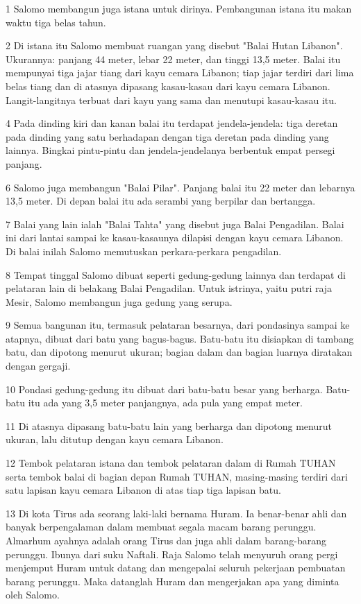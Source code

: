 \par 1 Salomo membangun juga istana untuk dirinya. Pembangunan istana itu makan waktu tiga belas tahun.
\par 2 Di istana itu Salomo membuat ruangan yang disebut "Balai Hutan Libanon". Ukurannya: panjang 44 meter, lebar 22 meter, dan tinggi 13,5 meter. Balai itu mempunyai tiga jajar tiang dari kayu cemara Libanon; tiap jajar terdiri dari lima belas tiang dan di atasnya dipasang kasau-kasau dari kayu cemara Libanon. Langit-langitnya terbuat dari kayu yang sama dan menutupi kasau-kasau itu.
\par 4 Pada dinding kiri dan kanan balai itu terdapat jendela-jendela: tiga deretan pada dinding yang satu berhadapan dengan tiga deretan pada dinding yang lainnya. Bingkai pintu-pintu dan jendela-jendelanya berbentuk empat persegi panjang.
\par 6 Salomo juga membangun "Balai Pilar". Panjang balai itu 22 meter dan lebarnya 13,5 meter. Di depan balai itu ada serambi yang berpilar dan bertangga.
\par 7 Balai yang lain ialah "Balai Tahta" yang disebut juga Balai Pengadilan. Balai ini dari lantai sampai ke kasau-kasaunya dilapisi dengan kayu cemara Libanon. Di balai inilah Salomo memutuskan perkara-perkara pengadilan.
\par 8 Tempat tinggal Salomo dibuat seperti gedung-gedung lainnya dan terdapat di pelataran lain di belakang Balai Pengadilan. Untuk istrinya, yaitu putri raja Mesir, Salomo membangun juga gedung yang serupa.
\par 9 Semua bangunan itu, termasuk pelataran besarnya, dari pondasinya sampai ke atapnya, dibuat dari batu yang bagus-bagus. Batu-batu itu disiapkan di tambang batu, dan dipotong menurut ukuran; bagian dalam dan bagian luarnya diratakan dengan gergaji.
\par 10 Pondasi gedung-gedung itu dibuat dari batu-batu besar yang berharga. Batu-batu itu ada yang 3,5 meter panjangnya, ada pula yang empat meter.
\par 11 Di atasnya dipasang batu-batu lain yang berharga dan dipotong menurut ukuran, lalu ditutup dengan kayu cemara Libanon.
\par 12 Tembok pelataran istana dan tembok pelataran dalam di Rumah TUHAN serta tembok balai di bagian depan Rumah TUHAN, masing-masing terdiri dari satu lapisan kayu cemara Libanon di atas tiap tiga lapisan batu.
\par 13 Di kota Tirus ada seorang laki-laki bernama Huram. Ia benar-benar ahli dan banyak berpengalaman dalam membuat segala macam barang perunggu. Almarhum ayahnya adalah orang Tirus dan juga ahli dalam barang-barang perunggu. Ibunya dari suku Naftali. Raja Salomo telah menyuruh orang pergi menjemput Huram untuk datang dan mengepalai seluruh pekerjaan pembuatan barang perunggu. Maka datanglah Huram dan mengerjakan apa yang diminta oleh Salomo.
